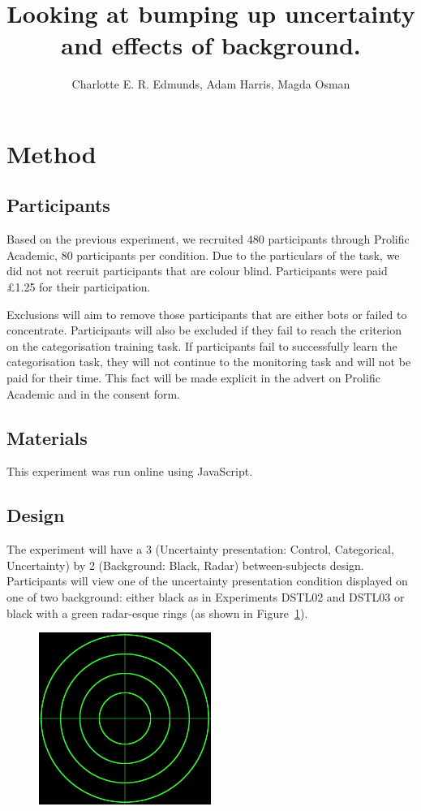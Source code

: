 \documentclass[doc, a4paper, apacite]{apa6}
\title{Looking at bumping up uncertainty and effects of background.}
\author{Charlotte E. R. Edmunds, Adam Harris, Magda Osman}
\affiliation{Queen Mary, UCL, University of London \\ 26 November 2020}
\begin{document}
\maketitle
\doublespacing

\section{Method}
\subsection{Participants}
Based on the previous experiment, we recruited 480 participants through Prolific Academic, 80 participants per condition. 
Due to the particulars of the task, we did not not recruit participants that are colour blind. 
Participants were paid \pounds1.25 for their participation. 

Exclusions will aim to remove those participants that are either bots or failed to concentrate. 
Participants will also be excluded if they fail to reach the criterion on the categorisation training task. 
If participants fail to successfully learn the categorisation task, they will not continue to the monitoring task and will not be paid for their time. 
This fact will be made explicit in the advert on Prolific Academic and in the consent form. 

\subsection{Materials}
This experiment was run online using JavaScript. 

\subsection{Design}
The experiment will have a 3 (Uncertainty presentation: Control, Categorical, Uncertainty) by 2 (Background: Black, Radar) between-subjects design. 
Participants will view one of the uncertainty presentation condition displayed on one of two background: either black as in Experiments DSTL02 and DSTL03 or black with a green radar-esque rings (as shown in Figure~\ref{fig:radar}). 

\begin{figure}
	\centering
	\includegraphics[width=0.5\textwidth]{images/radar.jpg}
	\caption{}
	\label{fig:radar}
\end{figure}
\end{document}
